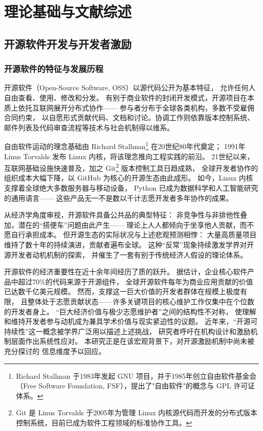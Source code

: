\chapter{理论基础与文献综述}

\section{开源软件开发与开发者激励}

\subsection{开源软件的特征与发展历程}

开源软件（Open-Source Software, OSS）以源代码公开为基本特征，
允许任何人自由查看、使用、修改和分发\cite{lakhani2003open}。
有别于商业软件的封闭开发模式，开源项目在本质上依托互联网展开分布式协作——
参与者分布于全球各类机构，多数不受雇佣合同约束，
以自愿形式贡献代码、文档和讨论。协调工作则依靠版本控制系统、
邮件列表及代码审查流程等技术与社会机制得以维系。

自由软件运动的理念基础由 Richard Stallman\footnote{Richard Stallman 于1983年发起 GNU 项目，并于1985年创立自由软件基金会（Free Software Foundation, FSF），提出了"自由软件"的概念与 GPL 许可证体系。} 在20世纪80年代奠定；
1991年 Linus Torvalds 发布 Linux 内核，将该理念推向工程实践的前沿。
21世纪以来，互联网基础设施快速普及，加之 Git\footnote{Git 是 Linus Torvalds 于2005年为管理 Linux 内核源代码而开发的分布式版本控制系统，目前已成为软件工程领域的标准协作工具。} 版本控制工具日趋成熟，
全球开发者协作的组织成本大幅下降，以 GitHub 为核心的开源生态由此成形。
如今，Linux 内核支撑着全球绝大多数服务器与移动设备，
Python 已成为数据科学和人工智能研究的通用语言——
这些产品无一不是数以千计志愿开发者多年协作的成果。

从经济学角度审视，开源软件具备公共品的典型特征：
非竞争性与非排他性叠加，潜在的“搭便车”问题由此产生——
理论上人人都倾向于坐享他人贡献，而不愿自行承担成本\cite{lerner2002simple}。
但开源生态的实际状况与上述悲观预测相悖：
大量高质量项目维持了数十年的持续演进，贡献者遍布全球。
这种“反常”现象持续激发学界对开源开发者动机机制的探索\cite{gerosa2021shifting}，
并催生了一套有别于传统经济人假设的理论体系。

开源软件的经济重要性在近十余年间经历了质的跃升。
据估计，企业核心软件产品中超过70\%的代码来源于开源组件，
全球开源软件每年为商业应用贡献的价值已达数千亿美元规模。
然而，支撑这一巨大价值的开发者群体在规模上极度有限，
且整体处于志愿贡献状态——许多关键项目的核心维护工作仅集中在个位数的开发者身上\cite{lu2021core,jamieson2024predicting}。
“巨大经济价值与极少志愿维护者”之间的结构性不对称，
使理解和维持开发者参与动机成为兼具学术价值与现实紧迫性的议题。
近年来，“开源可持续性”这一概念被学界广泛用以描述上述挑战，
研究者呼吁在机构设计和激励机制层面作出系统性应对\cite{alami2024sustainability,wang2025opensource,qi2021opensource}。
本研究正是在该宏观背景下，对开源激励机制中尚未被充分探讨的
信息维度予以回应。

